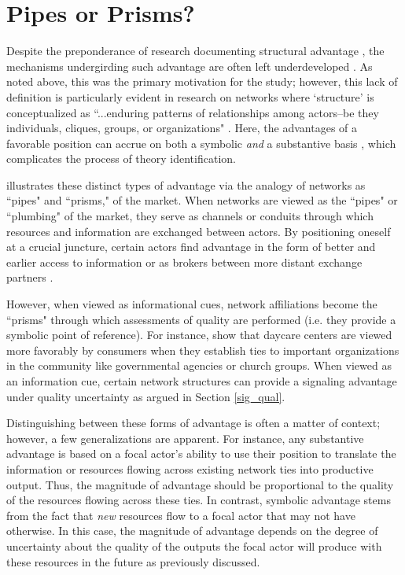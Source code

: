 \section{Pipes or Prisms? \label{pp}}

Despite the preponderance of research documenting structural advantage \citep[e.g.][]{benjamin1999, bothner2014, kim2014, podolny1993}, the mechanisms undergirding such advantage are often left underdeveloped \citep{jensen2011, podolny2001}. As noted above, this was the primary motivation for the \citet{malter2014} study; however, this lack of definition is particularly evident in research on networks where `structure' is conceptualized as ``...enduring patterns of relationships among actors--be they individuals, cliques, groups, or organizations" \citep[p. 2]{powell1999}. Here, the advantages of a favorable position can accrue on both a symbolic \emph{and} a substantive basis \citep[see e.g.][]{podolny2001}, which complicates the process of theory identification.

\citet{podolny2001} illustrates these distinct types of advantage via the analogy of networks as ``pipes" and ``prisms," of the market. When networks are viewed as the ``pipes" or ``plumbing" of the market, they serve as channels or conduits through which resources and information are exchanged between actors. By positioning oneself at a crucial juncture, certain actors find advantage in the form of better and earlier access to information \citep{powell1996} or as brokers between more distant exchange partners \citep{burt1992}.

However, when viewed as informational cues, network affiliations become the ``prisms" through which assessments of quality are performed (i.e. they provide a symbolic point of reference). For instance, \citet{baum1992} show that daycare centers are viewed more favorably by consumers when they establish ties to important organizations in the community like governmental agencies or church groups. When viewed as an information cue, certain network structures can provide a signaling advantage under quality uncertainty as argued in Section \ref{sig_qual}.

Distinguishing between these forms of advantage is often a matter of context; however, a few generalizations are apparent. For instance, any substantive advantage is based on a focal actor's ability to use their position to translate the information or resources flowing across existing network ties into productive output. Thus, the magnitude of advantage should be proportional to the quality of the resources flowing across these ties. In contrast, symbolic advantage stems from the fact that \emph{new} resources flow to a focal actor that may not have otherwise. In this case, the magnitude of advantage depends on the degree of uncertainty about the quality of the outputs the focal actor will produce with these resources in the future as previously discussed.

